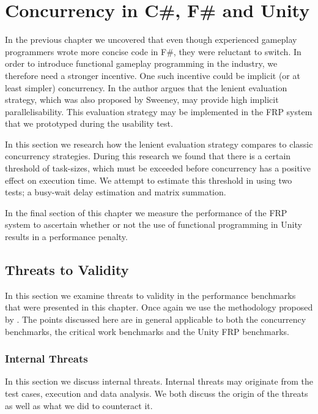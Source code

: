 \chapter{Concurrency in C\#, F\# and Unity}
In the previous chapter we uncovered that even though experienced gameplay programmers wrote more concise code in F\#, they were reluctant to switch. In order to introduce functional gameplay programming in the industry, we therefore need a stronger incentive. One such incentive could be implicit (or at least simpler) concurrency. In \cite{DBLP:journals/cl/Tremblay-parallel} the author argues that the lenient evaluation strategy, which was also proposed by Sweeney, may provide high implicit parallelisability. This evaluation strategy may be implemented in the \gls{FRP} system that we prototyped during the usability test.

In this section we research how the lenient evaluation strategy compares to classic concurrency strategies. During this research we found that there is a certain threshold of task-sizes, which must be exceeded before concurrency has a positive effect on execution time. We attempt to estimate this threshold in  using two tests; a busy-wait delay estimation and matrix summation.

In the final section of this chapter we measure the performance of the \gls{FRP} system to ascertain whether or not the use of functional programming in Unity results in a performance penalty.





\section{Threats to Validity}
In this section we examine threats to validity in the performance benchmarks that were presented in this chapter. Once again we use the methodology proposed by \cite{mcleod:validity}. The points discussed here are in general applicable to both the concurrency benchmarks, the critical work benchmarks and the Unity \gls{FRP} benchmarks.

\subsection{Internal Threats}
In this section we discuss internal threats. Internal threats may originate from the test cases, execution and data analysis. We both discuss the origin of the threats as well as what we did to counteract it.

